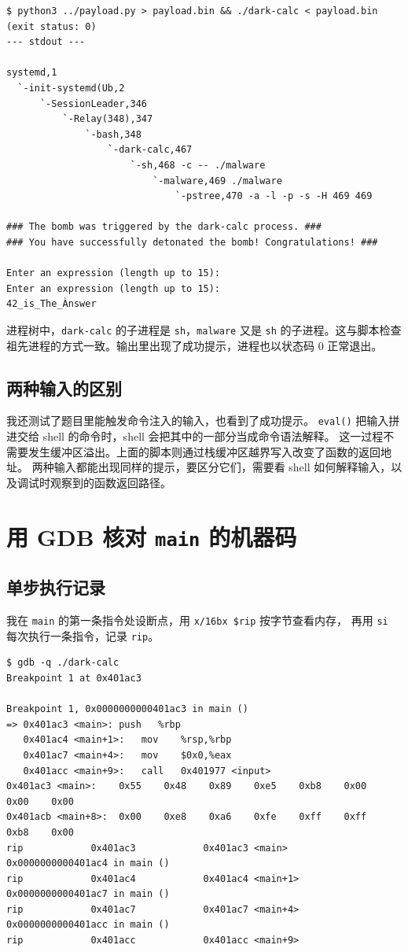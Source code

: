 \documentclass[UTF8,a4paper,12pt,fontset=windows]{ctexart}
\newcommand{\code}[1]{\texttt{#1}}
\begin{document}
\begin{lstlisting}
$ python3 ../payload.py > payload.bin && ./dark-calc < payload.bin
(exit status: 0)
--- stdout ---

systemd,1
  `-init-systemd(Ub,2
      `-SessionLeader,346
          `-Relay(348),347
              `-bash,348
                  `-dark-calc,467
                      `-sh,468 -c -- ./malware
                          `-malware,469 ./malware
                              `-pstree,470 -a -l -p -s -H 469 469

### The bomb was triggered by the dark-calc process. ###
### You have successfully detonated the bomb! Congratulations! ###

Enter an expression (length up to 15):
Enter an expression (length up to 15):
42_is_The_Ànswer
\end{lstlisting}

进程树中，\code{dark-calc} 的子进程是 \code{sh}，\code{malware} 又是
\code{sh} 的子进程。这与脚本检查祖先进程的方式一致。输出里出现了成功提示，进程也以状态码 0 正常退出。

\subsection{两种输入的区别}

我还测试了题目里能触发命令注入的输入，也看到了成功提示。
\code{eval()} 把输入拼进交给 shell 的命令时，shell 会把其中的一部分当成命令语法解释。
这一过程不需要发生缓冲区溢出。上面的脚本则通过栈缓冲区越界写入改变了函数的返回地址。
两种输入都能出现同样的提示，要区分它们，需要看 shell 如何解释输入，以及调试时观察到的函数返回路径。

\section{用 GDB 核对 \texorpdfstring{\code{main}}{main} 的机器码}

\subsection{单步执行记录}

我在 \code{main} 的第一条指令处设断点，用 \code{x/16bx \$rip} 按字节查看内存，
再用 \code{si} 每次执行一条指令，记录 \code{rip}。

\begin{lstlisting}
$ gdb -q ./dark-calc
Breakpoint 1 at 0x401ac3

Breakpoint 1, 0x0000000000401ac3 in main ()
=> 0x401ac3 <main>:	push   %rbp
   0x401ac4 <main+1>:	mov    %rsp,%rbp
   0x401ac7 <main+4>:	mov    $0x0,%eax
   0x401acc <main+9>:	call   0x401977 <input>
0x401ac3 <main>:	0x55	0x48	0x89	0xe5	0xb8	0x00	0x00	0x00
0x401acb <main+8>:	0x00	0xe8	0xa6	0xfe	0xff	0xff	0xb8	0x00
rip            0x401ac3            0x401ac3 <main>
0x0000000000401ac4 in main ()
rip            0x401ac4            0x401ac4 <main+1>
0x0000000000401ac7 in main ()
rip            0x401ac7            0x401ac7 <main+4>
0x0000000000401acc in main ()
rip            0x401acc            0x401acc <main+9>
\end{lstlisting}
\end{document}
